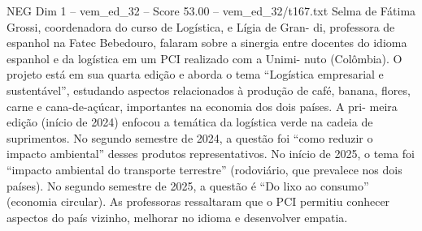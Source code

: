 \begin{textsample}{NEG Dim 1 – vem\_ed\_32 – Score 53.00 – vem\_ed\_32/t167.txt}
Selma de Fátima Grossi, coordenadora do curso de Logística, e Lígia de Gran- di, professora de espanhol na Fatec Bebedouro, falaram sobre a sinergia entre docentes do idioma espanhol e da logística em um PCI realizado com a Unimi- nuto (Colômbia).
O projeto está em sua quarta edição e aborda o tema “Logística empresarial e sustentável”, estudando aspectos relacionados à produção de café, banana, flores, carne e cana-de-açúcar, importantes na economia dos dois países.
A pri- meira edição (início de 2024) enfocou a temática da logística verde na cadeia de suprimentos.
No segundo semestre de 2024, a questão foi “como reduzir o impacto ambiental” desses produtos representativos.
No início de 2025, o tema foi “impacto ambiental do transporte terrestre” (rodoviário, que prevalece nos dois países).
No segundo semestre de 2025, a questão é “Do lixo ao consumo” (economia circular).
As professoras ressaltaram que o PCI permitiu conhecer aspectos do país vizinho, melhorar no idioma e desenvolver empatia.

\end{textsample}
